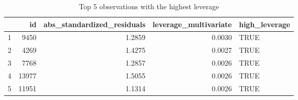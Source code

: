 \begin{table}[ht]
\centering
\begin{tabular}{rrrrl}
  \hline
 & id & abs\_standardized\_residuals & leverage\_multivariate & high\_leverage \\ 
  \hline
1 &  9450 & 1.2859 & 0.0030 & TRUE \\ 
  2 &  4269 & 1.4275 & 0.0027 & TRUE \\ 
  3 &  7768 & 1.2857 & 0.0026 & TRUE \\ 
  4 & 13977 & 1.5055 & 0.0026 & TRUE \\ 
  5 & 11951 & 1.1314 & 0.0026 & TRUE \\ 
   \hline
\end{tabular}
\caption{Top 5 observations with the highest leverage} 
\label{tab:highest_leverage_multivariate}
\end{table}
